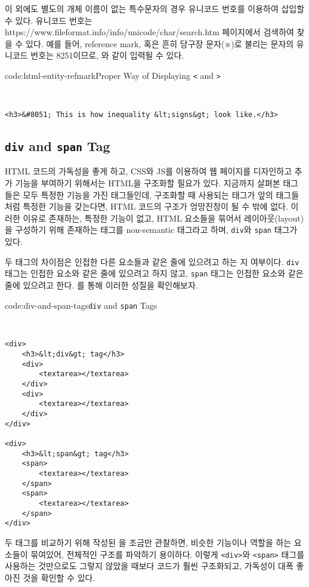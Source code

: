 이 외에도 별도의 개체 이름이 없는 특수문자의 경우 유니코드 번호를 이용하여 삽입할 수 있다. 유니코드 번호는 https://www.fileformat.info/info/unicode/char/search.htm 페이지에서 검색하여 찾을 수 있다. 예를 들어, reference mark, 혹은 흔히 당구장 문자(※)로 불리는 문자의 유니코드 번호는 8251이므로, 와 같이 입력될 수 있다.

\begin{codeenv}{code:html-entity-refmark}{Proper Way of Displaying \texttt{<} and \texttt{>}}\begin{verbatim}


<h3>&#8051; This is how inequality &lt;signs&gt; look like.</h3>
\end{verbatim}
\end{codeenv}

\subsection*{\texttt{div} and \texttt{span} Tag}
HTML 코드의 가독성을 좋게 하고, CSS와 JS를 이용하여 웹 페이지를 디자인하고 추가 기능을 부여하기 위해서는 HTML을 구조화할 필요가 있다. 지금까지 살펴본 태그들은 모두 특정한 기능을 가진 태그들인데, 구조화할 때 사용되는 태그가 앞의 태그들처럼 특정한 기능을 갖는다면, HTML 코드의 구조가 엉망진창이 될 수 밖에 없다. 이러한 이유로 존재하는, 특정한 기능이 없고, HTML 요소들을 묶어서 레이아웃(layout)을 구성하기 위해 존재하는 태그를 non-semantic 태그라고 하며, \verb|div|와 \verb|span| 태그가 있다. 

두 태그의 차이점은 인접한 다른 요소들과 같은 줄에 있으려고 하는 지 여부이다. \verb|div| 태그는 인접한 요소와 같은 줄에 있으려고 하지 않고, \verb|span| 태그는 인접한 요소와 같은 줄에 있으려고 한다. 를 통해 이러한 성질을 확인해보자.

\begin{codeenv}{code:div-and-span-tags}{\texttt{div} and \texttt{span} Tags}\begin{verbatim}


<div>
    <h3>&lt;div&gt; tag</h3>
    <div>
        <textarea></textarea>
    </div>
    <div>
        <textarea></textarea>
    </div>
</div>

<div>
    <h3>&lt;span&gt; tag</h3>
    <span>
        <textarea></textarea>
    </span>
    <span>
        <textarea></textarea>
    </span>
</div>
\end{verbatim}
\end{codeenv}

두 태그를 비교하기 위해 작성된 을 조금만 관찰하면, 비슷한 기능이나 역할을 하는 요소들이 묶여있어, 전체적인 구조를 파악하기 용이하다. 이렇게 \texttt{<div>}와 \texttt{<span>} 태그를 사용하는 것만으로도 그렇지 않았을 때보다 코드가 훨씬 구조화되고, 가독성이 대폭 좋아진 것을 확인할 수 있다. 